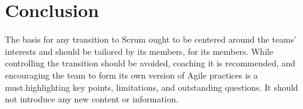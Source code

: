 \documentclass{scrartcl}
\begin{document}
    \section{Conclusion}
    
    The basis for any transition to Scrum ought to be centered around the teams' interests and should be tailored by its members, for its members. While controlling the transition should be avoided, coaching it is recommended, and encouraging the team to form its own version of Agile practices is a must.highlighting key points, limitations, and outstanding questions. It should not introduce any new content or information.

\printbibliography
\end{document}
